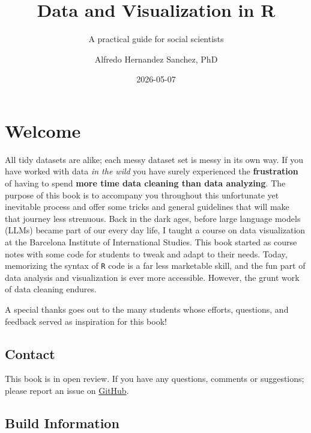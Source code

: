 \documentclass[
  letterpaper,
  DIV=11,
  numbers=noendperiod]{scrreprt}
\title{Data and Visualization in R}
\subtitle{A practical guide for social scientists}
\author{Alfredo Hernandez Sanchez, PhD}
\date{2026-05-07}
\renewcommand*\contentsname{Table of contents}
\newcommand\contentsname{Table of contents}
\begin{document}
\maketitle

\renewcommand*\contentsname{Table of contents}
{
\hypersetup{linkcolor=}
\setcounter{tocdepth}{2}
\tableofcontents
}


\chapter*{Welcome}\label{welcome}


All tidy datasets are alike; each messy dataset set is messy in its own
way. If you have worked with data \emph{in the wild} you have surely
experienced the \textbf{frustration} of having to spend \textbf{more
time data cleaning than data analyzing}. The purpose of this book is to
accompany you throughout this unfortunate yet inevitable process and
offer some tricks and general guidelines that will make that journey
less strenuous. Back in the dark ages, before large language models
(LLMs) became part of our every day life, I taught a course on data
visualization at the Barcelona Institute of International Studies. This
book started as course notes with some code for students to tweak and
adapt to their needs. Today, memorizing the syntax of \texttt{R} code is
a far less marketable skill, and the fun part of data analysis and
visualization is ever more accessible. However, the grunt work of data
cleaning endures.

A special thanks goes out to the many students whose efforts, questions,
and feedback served as inspiration for this book!

\section*{Contact}\label{contact}


This book is in open review. If you have any questions, comments or
suggestions; please report an issue on
\href{https://github.com/alfredo-hs/dviz_book}{GitHub}.

\section*{Build Information}\label{build-information}
\end{document}
